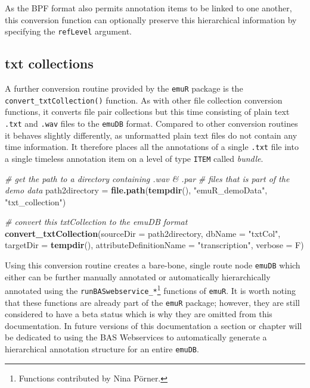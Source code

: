 \documentclass[]{book}
\newenvironment{Shaded}{\begin{snugshade}}{\end{snugshade}}
\newcommand{\CommentTok}[1]{\textcolor[rgb]{0.56,0.35,0.01}{\textit{#1}}}
\newcommand{\DataTypeTok}[1]{\textcolor[rgb]{0.13,0.29,0.53}{#1}}
\newcommand{\KeywordTok}[1]{\textcolor[rgb]{0.13,0.29,0.53}{\textbf{#1}}}
\newcommand{\NormalTok}[1]{#1}
\newcommand{\StringTok}[1]{\textcolor[rgb]{0.31,0.60,0.02}{#1}}
\let\rmarkdownfootnote\footnote%
\def\footnote{\protect\rmarkdownfootnote}
\begin{document}
As the BPF format also permits annotation items to be linked to one another, this conversion function can optionally preserve this hierarchical information by specifying the \texttt{refLevel} argument.

\hypertarget{txt-collections}{%
\subsection{txt collections}\label{txt-collections}}

A further conversion routine provided by the \texttt{emuR} package is the \texttt{convert\_txtCollection()} function. As with other file collection conversion functions, it converts file pair collections but this time consisting of plain text \texttt{.txt} and \texttt{.wav} files to the \texttt{emuDB} format. Compared to other conversion routines it behaves slightly differently, as unformatted plain text files do not contain any time information. It therefore places all the annotations of a single \texttt{.txt} file into a single timeless annotation item on a level of type \texttt{ITEM} called \emph{bundle}.

\begin{Shaded}
\begin{Highlighting}[]
\CommentTok{# get the path to a directory containing .wav & .par}
\CommentTok{# files that is part of the demo data}
\NormalTok{path2directory =}\StringTok{ }\KeywordTok{file.path}\NormalTok{(}\KeywordTok{tempdir}\NormalTok{(),}
                           \StringTok{"emuR_demoData"}\NormalTok{,}
                           \StringTok{"txt_collection"}\NormalTok{)}

\CommentTok{# convert this txtCollection to the emuDB format}
\KeywordTok{convert_txtCollection}\NormalTok{(}\DataTypeTok{sourceDir =}\NormalTok{ path2directory,}
                      \DataTypeTok{dbName =} \StringTok{"txtCol"}\NormalTok{,}
                      \DataTypeTok{targetDir =} \KeywordTok{tempdir}\NormalTok{(),}
                      \DataTypeTok{attributeDefinitionName =} \StringTok{"transcription"}\NormalTok{,}
                      \DataTypeTok{verbose =}\NormalTok{ F)}
\end{Highlighting}
\end{Shaded}

Using this conversion routine creates a bare-bone, single route node \texttt{emuDB} which either can be further manually annotated or automatically hierarchically annotated using the \texttt{runBASwebservice\_*}\footnote{Functions contributed by Nina Pörner.} functions of \texttt{emuR}. It is worth noting that these functions are already part of the \texttt{emuR} package; however, they are still considered to have a beta status which is why they are omitted from this documentation. In future versions of this documentation a section or chapter will be dedicated to using the BAS Webservices \citep{kisler:2012a} to automatically generate a hierarchical annotation structure for an entire \texttt{emuDB}.
\end{document}
